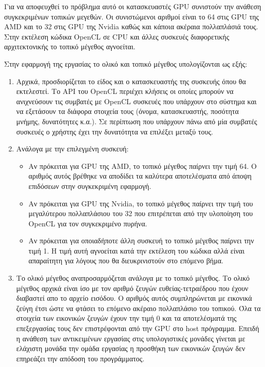 Για να αποφευχθεί το πρόβλημα αυτό οι κατασκευαστές GPU συνιστούν την ανάθεση συγκεκριμένων τοπικών μεγεθών. Οι συνιστώμενοι αριθμοί είναι το 64 στις GPU της AMD και το 32 στις GPU της Nvidia καθώς και κάποια ακέραια πολλαπλάσιά τους. Στην εκτέλεση κώδικα OpenCL σε CPU και άλλες συσκευές διαφορετικής αρχιτεκτονικής το τοπικό μέγεθος αγνοείται. 

Στην εφαρμογή της εργασίας το ολικό και τοπικό μέγεθος υπολογίζονται ως εξής:

\begin{enumerate}
\item Αρχικά, προσδιορίζεται το είδος και ο κατασκευαστής της συσκευής όπου θα εκτελεστεί. Το API του OpenCL περιέχει κλήσεις οι οποίες μπορούν να ανιχνεύσουν τις συμβατές με OpenCL συσκευές που υπάρχουν στο σύστημα και να εξετάσουν τα διάφορα στοιχεία τους (όνομα, κατασκευαστής, ποσότητα μνήμης, δυνατότητες κ.α.). Σε περίπτωση που υπάρχουν πάνω από μία συμβατές συσκευές ο χρήστης έχει την δυνατότητα να επιλέξει μεταξύ τους. 
\item Ανάλογα με την επιλεγμένη συσκευή:
	\begin{itemize}
	\item Αν πρόκειται για GPU της AMD, το τοπικό μέγεθος παίρνει την τιμή 	64. Ο αριθμός αυτός βρέθηκε να αποδίδει τα καλύτερα αποτελέσματα από 		άποψη επιδόσεων στην συγκεκριμένη εφαρμογή.
	\item Αν πρόκειται για GPU της Nvidia, το τοπικό μέγεθος παίρνει την 		τιμή του μεγαλύτερου πολλαπλάσιου του 32 που επιτρέπεται από την 			υλοποίηση του OpenCL για τον συγκεκριμένο πυρήνα.
	\item Αν πρόκειται για οποιαδήποτε άλλη συσκευή το τοπικό μέγεθος 			παίρνει την τιμή 1. Η τιμή αυτή αγνοείται κατά την εκτέλεση του κώδικα 	αλλά είναι απαραίτητη για λόγους που θα διευκρινιστούν στο επόμενο βήμα.
  \end{itemize} 
\item Το ολικό μέγεθος αναπροσαρμόζεται ανάλογα με το τοπικό μέγεθος. Το ολικό μέγεθος αρχικά είναι ίσο με τον αριθμό ζευγών ευθείας-τετραέδρου που έχουν διαβαστεί απο το αρχείο εισόδου. Ο αριθμός αυτός συμπληρώνεται με εικονικά ζεύγη έτσι ώστε να φτάσει το επόμενο ακέραιο πολλαπλάσιο του τοπικού. Όλα τα στοιχεία των εικονικών ζευγών έχουν την τιμή 0 και τα αποτελέσματά της επεξεργασίας τους δεν επιστρέφονται από την GPU στο host πρόγραμμα. Επειδή η ανάθεση των αντικειμένων εργασίας στις υπολογιστικές μονάδες γίνεται με ελάχιστη μονάδα την ομάδα εργασίας η προσθήκη των εικονικών ζευγών δεν επηρεάζει την απόδοση του προγράμματος.
\end{enumerate}

